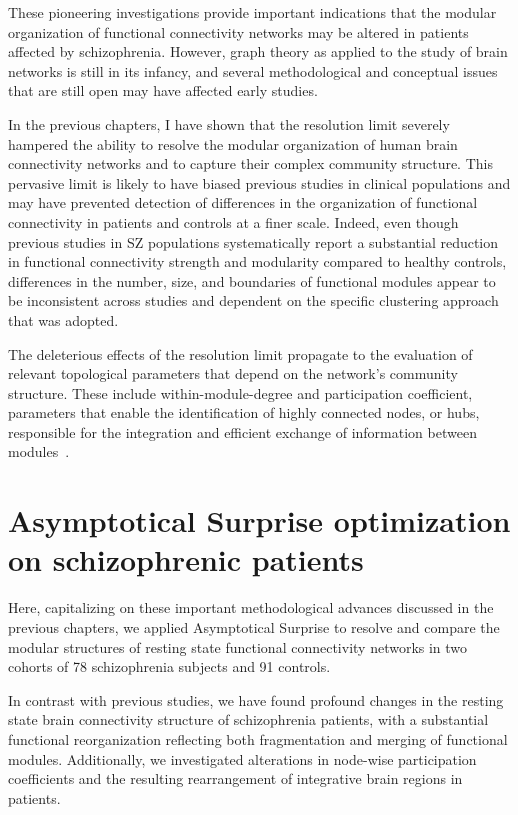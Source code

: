These pioneering investigations provide important indications that the modular organization of functional connectivity networks may be altered in patients affected by schizophrenia.
However, graph theory as applied to the study of brain networks is still in its infancy, and several methodological and conceptual issues that are still open may have affected early studies.

In the previous chapters, I have shown that the resolution limit severely hampered the ability to resolve the modular organization of human brain connectivity networks and to capture their complex community structure.
This pervasive limit is likely to have biased previous studies in clinical populations and may have prevented detection of differences in the organization of functional connectivity in patients and controls at a finer scale.
Indeed, even though previous studies in SZ populations systematically report a substantial reduction in functional connectivity strength and modularity compared to healthy controls, differences in the number, size, and boundaries of functional modules appear to be inconsistent across studies and dependent on the specific clustering approach that was adopted.

The deleterious effects of the resolution limit propagate to the evaluation of relevant topological parameters that depend on the network's community structure.
These include within-module-degree and participation coefficient, parameters that enable the identification of highly connected nodes, or hubs, responsible for the integration and efficient exchange of information between modules~\cite{bullmore2009}.

\section{Asymptotical Surprise optimization on schizophrenic patients}
Here, capitalizing on these important methodological advances discussed in the previous chapters, we applied Asymptotical Surprise to resolve and compare the modular structures of resting state functional connectivity networks in two cohorts of 78 schizophrenia subjects and 91 controls.

In contrast with previous studies, we have found profound changes in the resting state brain connectivity structure of schizophrenia patients, with a substantial functional reorganization reflecting both fragmentation and merging of functional modules.
Additionally, we investigated alterations in node-wise participation coefficients and the resulting rearrangement of integrative brain regions in patients.


